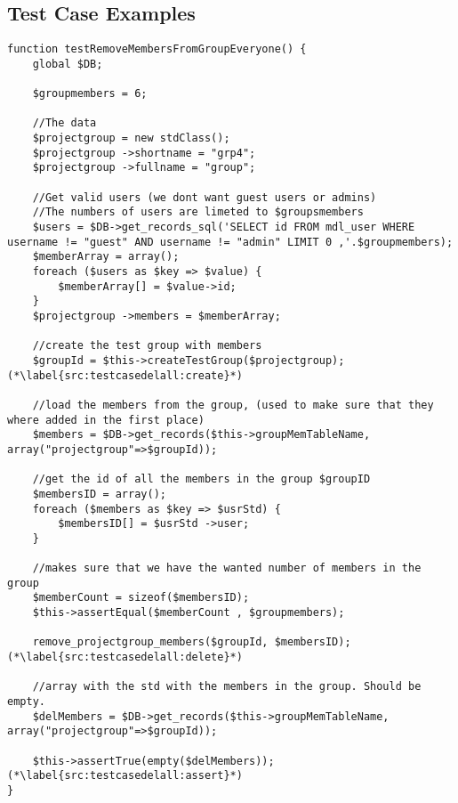 \subsection{Test Case Examples}
\label{sub:testCaseEg}
\begin{lstlisting}[style=phpCode, caption=\myCaption{A test case for the function remove\_projectgroup\_members. The test case tests if the function correctly removes all the members of the project group when instructed to.}, label=src:testcasedelall]
function testRemoveMembersFromGroupEveryone() {
    global $DB;
    
    $groupmembers = 6;
    
    //The data
    $projectgroup = new stdClass(); 
    $projectgroup ->shortname = "grp4";
    $projectgroup ->fullname = "group";
    
    //Get valid users (we dont want guest users or admins)
    //The numbers of users are limeted to $groupsmembers
    $users = $DB->get_records_sql('SELECT id FROM mdl_user WHERE username != "guest" AND username != "admin" LIMIT 0 ,'.$groupmembers);
    $memberArray = array();
    foreach ($users as $key => $value) {
        $memberArray[] = $value->id;
    }
    $projectgroup ->members = $memberArray;
    
    //create the test group with members
    $groupId = $this->createTestGroup($projectgroup); (*\label{src:testcasedelall:create}*)
    
    //load the members from the group, (used to make sure that they where added in the first place)
    $members = $DB->get_records($this->groupMemTableName, array("projectgroup"=>$groupId));
    
    //get the id of all the members in the group $groupID
    $membersID = array();
    foreach ($members as $key => $usrStd) {
        $membersID[] = $usrStd ->user;
    } 
    
    //makes sure that we have the wanted number of members in the group
    $memberCount = sizeof($membersID);
    $this->assertEqual($memberCount , $groupmembers);
    
    remove_projectgroup_members($groupId, $membersID); (*\label{src:testcasedelall:delete}*)
    
    //array with the std with the members in the group. Should be empty.
    $delMembers = $DB->get_records($this->groupMemTableName, array("projectgroup"=>$groupId));
    
    $this->assertTrue(empty($delMembers)); (*\label{src:testcasedelall:assert}*)
}
\end{lstlisting}

